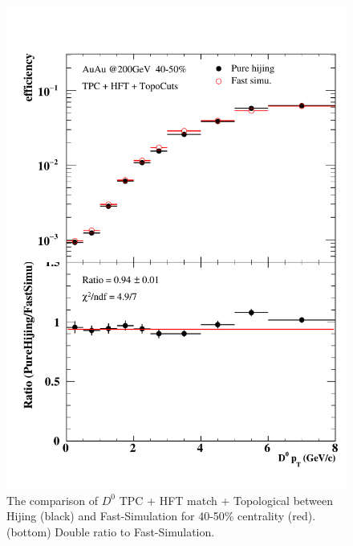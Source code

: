 \begin{figure}[htbp]
\begin{minipage}[htbp]{0.47\linewidth}
\includegraphics[width=1.0\textwidth,angle=0]{figure/Run14_D0HFT/40_50_2.pdf} 
\caption{ The comparison of $D^0$ TPC + HFT match + Topological between Hijing (black) and Fast-Simulation for 40-50\% centrality (red). (bottom) Double ratio to Fast-Simulation.\label{40_50}}
\end{minipage}
\end{figure}

